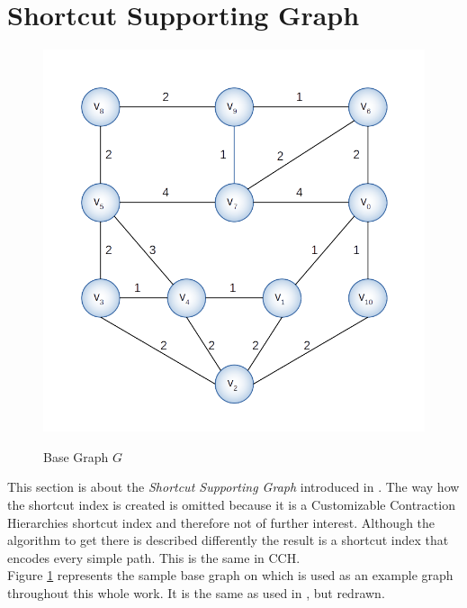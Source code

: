 \documentclass[twocolumn]{article}
\begin{document}
\section{Shortcut Supporting Graph}

\begin{figure}[h]
    \caption{Base Graph $G$}
    \centering
    \includegraphics[width=\linewidth]{baseGraph}
    \label{fig:baseGraph}
\end{figure}

This section is about the \textit{Shortcut Supporting Graph} introduced in \cite{Ouyang2020}.
The way how the shortcut index is created is omitted because it is a Customizable Contraction
Hierarchies shortcut index and therefore not of further interest. Although the algorithm to get
there is described differently the result is a shortcut index that encodes every simple path.
This is the same in CCH.
\\
Figure \ref{fig:baseGraph} represents the sample base graph on which is used as an example graph 
throughout this whole work. It is the same as used in \cite{Ouyang2020}, but redrawn.
\end{document}
